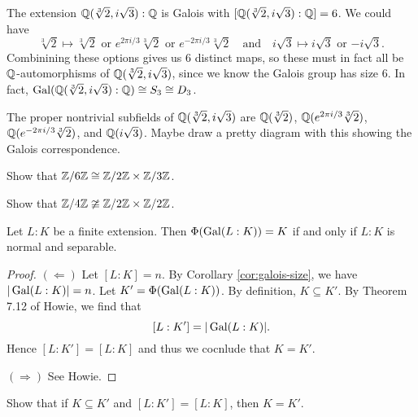\begin{example}
  The extension $\mathbb{Q}(\sqrt[3]{2}, i\sqrt{3}) : \mathbb{Q}$ is
  Galois with $[\mathbb{Q}(\sqrt[3]{2}, i\sqrt{3}) : \mathbb{Q}] = 6$.
  We could have
  \[
    \sqrt[3]{2} \mapsto \sqrt[3]{2} \text{ or } e^{2\pi i / 3} \sqrt[3]{2} \text{ or } e^{-2\pi i / 3} \sqrt[3]{2}
    \quad \text{and} \quad
    i\sqrt{3} \mapsto i\sqrt{3} \text{ or } {-i\sqrt{3}}.
  \]
  Combinining these options gives us $6$ distinct
  maps, so these must in fact all be
  $\mathbb{Q}$-automorphisms of $\mathbb{Q}(\sqrt[3]{2}, i\sqrt{3})$,
  since we know the Galois group has size $6$.
  In fact, $\operatorname{Gal}(\mathbb{Q}(\sqrt[3]{2}, i\sqrt{3}) : \mathbb{Q}) \cong S_3 \cong D_3$.
\end{example}

\begin{remark}
  The proper nontrivial subfields of
  $\mathbb{Q}(\sqrt[3]{2}, i\sqrt{3})$ are
  $\mathbb{Q}(\sqrt[3]{2})$, $\mathbb{Q}(e^{2\pi i / 3}\sqrt[3]{2})$,
  $\mathbb{Q}(e^{-2\pi i / 3}\sqrt[3]{2})$, and
  $\mathbb{Q}(i\sqrt{3})$. Maybe draw a pretty diagram with this
  showing the Galois correspondence.
\end{remark}

\begin{exercise}
  Show that $\mathbb{Z} / 6\mathbb{Z} \cong \mathbb{Z} / 2\mathbb{Z} \times \mathbb{Z} / 3\mathbb{Z}$.
\end{exercise}

\begin{exercise}
  Show that $\mathbb{Z} / 4\mathbb{Z} \ncong \mathbb{Z} / 2\mathbb{Z} \times \mathbb{Z} / 2\mathbb{Z}$.
\end{exercise}

\begin{theorem}
  Let $L : K$ be a finite extension.
  Then $\Phi(\operatorname{Gal}(L : K)) = K$ if and only if
  $L : K$ is normal and separable.
\end{theorem}

\begin{proof}
  $(\Leftarrow)$ Let $[L : K] = n$. By Corollary
  \ref{cor:galois-size}, we have $|\operatorname{Gal}(L : K)| = n$.
  Let $K' = \Phi(\operatorname{Gal}(L : K))$. By definition,
  $K \subseteq K'$. By Theorem 7.12 of Howie, we find that
  \[
    [L : K'] = |\operatorname{Gal}(L : K)|.
  \]
  Hence $[L : K'] = [L : K]$ and thus we cocnlude
  that $K = K'$.

  $(\Rightarrow)$ See Howie.
\end{proof}

\begin{exercise}
  Show that if $K \subseteq K'$ and
  $[L : K'] = [L : K]$, then $K = K'$.
\end{exercise}

